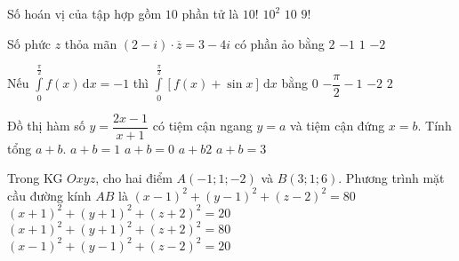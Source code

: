 \begin{ex}%
	Số hoán vị của tập hợp gồm $10$ phần tử là 
	\choice
	{\True $10!$}
	{$10^2$}
	{$10$}
	{$9!$}
\end{ex}
\begin{ex}%
	Số phức $z$ thỏa mãn $(2-i)\cdot \overline{z}=3-4i$ có phần ảo bằng
	\choice
	{$2$}
	{$-1$}
	{\True $1$}
	{$-2$}
\end{ex}
\begin{ex}%
	Nếu $\displaystyle\int\limits_0^{\frac{\pi}{2}} f(x) \mathrm{\,d}x=-1$ thì $\displaystyle\int\limits_0^{\frac{\pi}{2}} \left[f(x)+\sin x\right] \mathrm{\,d}x$ bằng
	\choice
	{\True $0$}
	{$-\dfrac{\pi}{2}-1$}
	{$-2$}
	{$2$}
\end{ex}
\begin{ex}%
	Đồ thị hàm số $y=\dfrac{2x-1}{x+1}$ có tiệm cận ngang $y=a$ và tiệm cận đứng $x=b$. Tính tổng $a+b$.
	\choice
	{\True $a+b=1$}
	{$a+b=0$}
	{$a+b2$}
	{$a+b=3$}
\end{ex}
\begin{ex}%
	Trong KG $Oxyz$, cho hai điểm $A(-1;1;-2)$ và $B(3;1;6)$. Phương trình mặt cầu đường kính $AB$ là 
	\choice
	{$(x-1)^2+(y-1)^2+(z-2)^2=80$}
	{$(x+1)^2+(y+1)^2+(z+2)^2=20$}
	{$(x+1)^2+(y+1)^2+(z+2)^2=80$}
	{\True $(x-1)^2+(y-1)^2+(z-2)^2=20$}
\end{ex}


